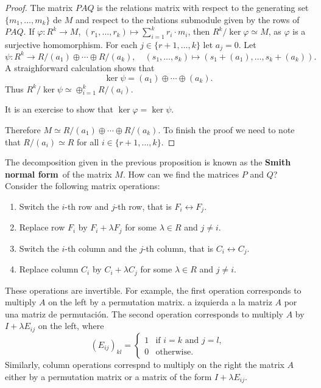 \begin{proof}
	The matrix $PAQ$ is the relations matrix with respect to 
	the generating set $\{m_1,\dots,m_k\}$ de $M$ and respect to the relations submodule 
	given by the rows of $PAQ$.  If $\varphi\colon R^k\to
	M$, $(r_1,\dots,r_k)\mapsto \sum_{i=1}^k r_i\cdot m_i$, then 
	$R^k/\ker\varphi\simeq M$, as $\varphi$ is a surjective homomorphism. For each 
	$j\in\{r+1,\dots,k\}$ let $a_j=0$.  Let 
	\[
		\psi\colon R^k\to R/(a_1)\oplus\cdots\oplus R/(a_k),\quad
		(s_1,\dots,s_k)\mapsto (s_1+(a_1),\dots,s_k+(a_k)). 
	\]
	A straighforward calculation shows that 
	\[
		\ker\psi=(a_1)\oplus\cdots\oplus (a_k).
	\]
	Thus 
	$R^k/\ker\psi\simeq \oplus_{i=1}^k R/(a_i)$. 
	
	It is an exercise to show that $\ker\varphi=\ker\psi$. 
	

	Therefore $M\simeq R/(a_1)\oplus\cdots\oplus R/(a_k)$. To finish the proof
	we need to note that $R/(a_i)\simeq R$ for all $i\in\{r+1,\dots,k\}$. 
\end{proof}

The decomposition given in the previous proposition is known as 
the \textbf{Smith normal form} of the matrix $M$. 
How can we find the matrices $P$ and $Q$? 
Consider the following matrix operations: 
\begin{enumerate}
	\item Switch the $i$-th row and $j$-th row, that is $F_i\leftrightarrow F_j$.
	\item Replace row $F_i$ by $F_i+\lambda F_j$ for some $\lambda\in R$ and $j\ne i$.
	\item Switch the $i$-th column and the $j$-th column, that is $C_i\leftrightarrow C_j$.
	\item Replace column $C_i$ by $C_i+\lambda C_j$ for some $\lambda\in R$ and $j\ne i$. 
\end{enumerate}
These operations are invertible. For example, the first operation
corresponds to multiply $A$ on the left by a permutation matrix. 
a izquierda a la matriz $A$ por una matriz de permutación. The second
operation corresponds to multiply $A$ by $I+\lambda E_{ij}$ on the left, 
where 
\[
(E_{ij})_{kl}=\begin{cases}
1 & \text{if $i=k$ and $j=l$},\\
0 & \text{otherwise}.	
\end{cases}
\]
Similarly, column operations correspnd to multiply on the right the matrix $A$
either by a permutation matrix or a matrix of the form $I+\lambda E_{ij}$. 
  
